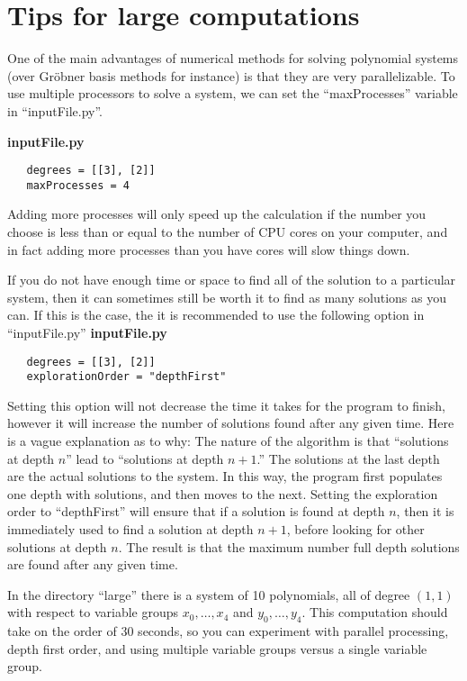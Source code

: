 \documentclass[12pt]{article}
\theoremstyle{definition}
\begin{document}
\section{Tips for large computations}

One of the main advantages of numerical methods for solving polynomial 
systems (over Gr\"{o}bner basis methods for instance) is that they are 
very parallelizable. To use multiple processors to solve a system, we 
can set the ``maxProcesses'' variable in ``inputFile.py''.

\noindent \textbf{inputFile.py}
\begin{leftbar}
\vspace{-10pt} 
\begin{verbatim}
   degrees = [[3], [2]]
   maxProcesses = 4
\end{verbatim}\vspace{-10pt} 
\end{leftbar}

Adding more processes will only speed up the calculation if the number 
you choose is less than or equal to the number of CPU cores on your 
computer, and in fact adding more processes than you have cores will 
slow things down.

If you do not have enough time or space to find all of the solution to a 
particular system, then it can sometimes still be worth it to find as 
many solutions as you can. If this is the case, the it is recommended to 
use the following option in ``inputFile.py''
\noindent \textbf{inputFile.py}
\begin{leftbar}
\vspace{-10pt} 
\begin{verbatim}
   degrees = [[3], [2]]
   explorationOrder = "depthFirst"
\end{verbatim}\vspace{-10pt} 
\end{leftbar}
Setting this option will not decrease the time it takes for the program 
to finish, however it will increase the number of solutions 
found after any given time. Here is a vague explanation as to why: The 
nature of the algorithm is that ``solutions at depth $n$'' lead to 
``solutions at depth $n+1$.'' The solutions at the last depth are the 
actual solutions to the system. In this way, the program first populates 
one depth with solutions, and then moves to the next. Setting the 
exploration order to ``depthFirst'' will ensure that if a solution is 
found at depth $n$, then it is immediately used to find a solution at 
depth $n+1$, before looking for other solutions at depth $n$. The result 
is that the maximum number full depth solutions are found after any 
given time.

In the directory ``large'' there is a system of 10 polynomials, all of 
degree $(1,1)$ with respect to variable groups $x_0, \ldots, x_4$ and 
$y_0, \ldots, y_4$. This computation should take on the order of 30 
seconds, so you can experiment with parallel processing, depth first 
order, and using multiple variable groups versus a single variable 
group.




\end{document}
